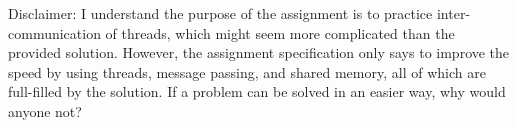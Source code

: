 \documentclass[12pt]{article}
\begin{document}
    Disclaimer: I understand the purpose of the assignment is to practice inter-communication of threads, which might seem more complicated than the provided solution.
    However, the assignment specification only says to improve the speed by using threads, message passing, and shared memory, all of which are full-filled by the solution.
    If a problem can be solved in an easier way, why would anyone not?
\end{document}
